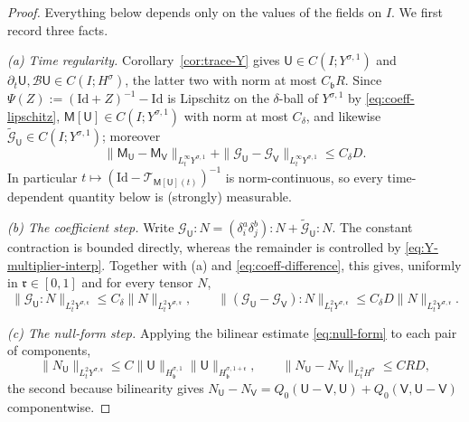 \documentclass[11pt,reqno]{amsart}
\theoremstyle{plain}
\theoremstyle{definition}
\theoremstyle{remark}
\numberwithin{equation}{section}
\newcommand{\breg}{\mathfrak b}
\newcommand{\rpar}{\mathfrak r}
\newcommand{\Ufield}{\mathsf U}
\newcommand{\Mmat}{\mathsf M}
\newcommand{\Ccoef}{\mathcal G}   %
\newcommand{\Vfield}{\mathsf V}
\begin{document}
\begin{proof}
Everything below depends only on the values of the fields on $I$.  We first
record three facts.

\emph{(a) Time regularity.}  Corollary~\ref{cor:trace-Y} gives
$\Ufield\in C(I;Y^{\sigma,1})$ and
$\partial_t\Ufield,\mathcal B\Ufield\in C(I;H^\sigma)$, the latter two with
norm at most $C_{\breg}R$.  Since
$\Psi(Z):=(\mathrm{Id}+Z)^{-1}-\mathrm{Id}$ is Lipschitz on the $\delta$-ball
of $Y^{\sigma,1}$ by \eqref{eq:coeff-lipschitz},
$\Mmat[\Ufield]\in C(I;Y^{\sigma,1})$ with norm at most $C_\delta$, and
likewise $\widetilde{\Ccoef}_{\Ufield}\in C(I;Y^{\sigma,1})$; moreover
\begin{equation}\label{eq:coeff-difference}
 \|\Mmat_{\Ufield}-\Mmat_{\Vfield}\|_{L^\infty_tY^{\sigma,1}}
 +\|\Ccoef_{\Ufield}-\Ccoef_{\Vfield}\|_{L^\infty_tY^{\sigma,1}}
 \le C_\delta D .
\end{equation}
In particular $t\mapsto(\mathrm{Id}-\mathscr T_{\Mmat[\Ufield](t)})^{-1}$ is
norm-continuous, so every time-dependent quantity below is (strongly)
measurable.

\emph{(b) The coefficient step.} Write
$\Ccoef_{\Ufield}:N=(\delta_i^a\delta_j^b):N
+\widetilde{\Ccoef}_{\Ufield}:N$. The constant contraction is bounded directly,
whereas the remainder is controlled by \eqref{eq:Y-multiplier-interp}. Together
with (a) and \eqref{eq:coeff-difference}, this gives, uniformly in
$\rpar\in[0,1]$ and for every tensor $N$,
\begin{equation}\label{eq:coefficient-step}
 \|\Ccoef_{\Ufield}:N\|_{L^2_tY^{\sigma,\rpar}}
 \le C_\delta\|N\|_{L^2_tY^{\sigma,\rpar}},
 \qquad
 \|(\Ccoef_{\Ufield}-\Ccoef_{\Vfield}):N\|_{L^2_tY^{\sigma,\rpar}}
 \le C_\delta D \|N\|_{L^2_tY^{\sigma,\rpar}} .
\end{equation}

\emph{(c) The null-form step.}  Applying the bilinear estimate
\eqref{eq:null-form} to each pair of components,
\begin{equation}\label{eq:nullform-step}
 \|N_{\Ufield}\|_{L^2_tY^{\sigma,\rpar}}
 \le C\|\Ufield\|_{H^{\sigma,1}_{\breg}}
      \|\Ufield\|_{H^{\sigma,1+\rpar}_{\breg}},
 \qquad
 \|N_{\Ufield}-N_{\Vfield}\|_{L^2_tH^\sigma}\le CRD ,
\end{equation}
the second because bilinearity gives
$N_{\Ufield}-N_{\Vfield}
=Q_0(\Ufield-\Vfield,\Ufield)+Q_0(\Vfield,\Ufield-\Vfield)$ componentwise.


\end{proof}
\end{document}
